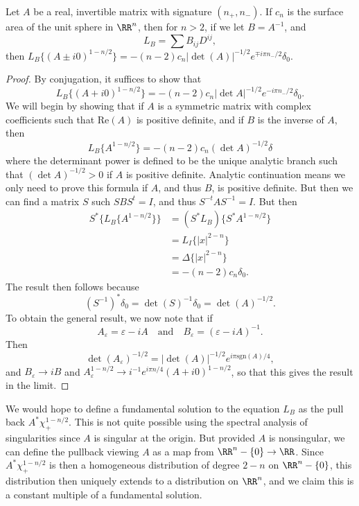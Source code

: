 \begin{lemma}
    Let $A$ be a real, invertible matrix with signature $(n_+,n_-)$. If $c_n$ is the surface area of the unit sphere in $\RR^n$, then for $n > 2$, if we let $B = A^{-1}$, and
    \[ L_B = \sum B_{ij} D^{ij}, \]
    then $L_B \{ (A \pm i 0)^{1 - n/2} \} = - (n-2) c_n |\det(A)|^{-1/2} e^{\mp i \pi n_- / 2} \delta_0$.
\end{lemma}
\begin{proof}
    By conjugation, it suffices to show that
    \[ L_B \{ (A + i 0)^{1-n/2} \} = - (n-2) c_n |\det A|^{-1/2} e^{- i \pi n_- / 2} \delta_0. \]
    We will begin by showing that if $A$ is a symmetric matrix with complex coefficients such that $\text{Re}(A)$ is positive definite, and if $B$ is the inverse of $A$, then
    \[ L_B \{ A^{1-n/2} \} = -(n-2) c_n (\det A)^{-1/2} \delta \]
    where the determinant power is defined to be the unique analytic branch such that $(\det A)^{-1/2} > 0$ if $A$ is positive definite. Analytic continuation means we only need to prove this formula if $A$, and thus $B$, is positive definite. But then we can find a matrix $S$ such $S B S^t = I$, and thus $S^{-t} A S^{-1} = I$. But then
    \begin{align*}
        S^* \{ L_B \{ A^{1-n/2} \} \} &= (S^* L_B) \{ S^* A^{1-n/2} \}\\
        &=  L_I \{ |x|^{2-n} \}\\
        &= \Delta \{ |x|^{2-n} \}\\
        &= - (n-2) c_n \delta_0.
    \end{align*}
    The result then follows because
    \[ (S^{-1})^* \delta_0 = \det(S)^{-1} \delta_0 = \det(A)^{-1/2}. \]
    To obtain the general result, we now note that if
    \[ A_\varepsilon = \varepsilon - i A \quad\text{and}\quad B_\varepsilon = (\varepsilon - iA)^{-1}. \]
    Then
    \[ \det(A_\varepsilon)^{-1/2} = |\det(A)|^{-1/2} e^{i \pi \text{sgn}(A) / 4}, \]
    and $B_\varepsilon \to i B$ and $A_\varepsilon^{1-n/2} \to i^{-1} e^{i \pi n / 4} (A + i0)^{1-n/2}$, so that this gives the result in the limit.
\end{proof}
 
We would hope to define a fundamental solution to the equation $L_B$ as the pull back $A^* \chi_+^{1-n/2}$. This is not quite possible using the spectral analysis of singularities since $A$ is singular at the origin. But provided $A$ is nonsingular, we can define the pullback viewing $A$ as a map from $\RR^n - \{ 0 \} \to \RR$. Since $A^* \chi_+^{1-n/2}$ is then a homogeneous distribution of degree $2-n$ on $\RR^n - \{ 0 \}$, this distribution then uniquely extends to a distribution on $\RR^n$, and we claim this is a constant multiple of a fundamental solution.

